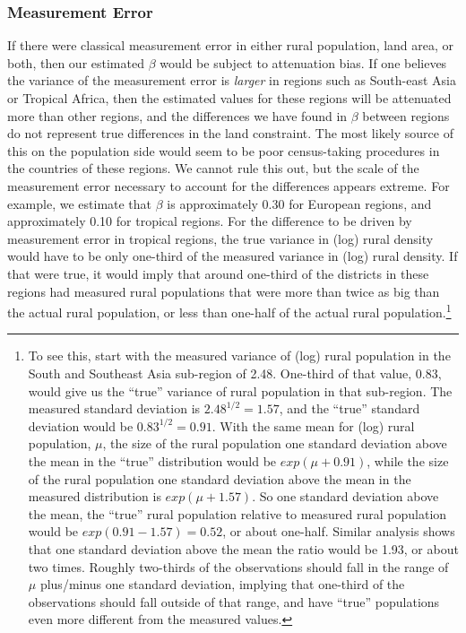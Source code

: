 \documentclass[11pt]{article}
\begin{document}
\subsubsection{Measurement Error} 
If there were classical measurement error in either rural population, land area, or both, then our estimated $\beta$ would be subject to attenuation bias. If one believes the variance of the measurement error is \textit{larger} in regions such as South-east Asia or Tropical Africa, then the estimated values for these regions will be attenuated more than other regions, and the differences we have found in $\beta$ between regions do not represent true differences in the land constraint. The most likely source of this on the population side would seem to be poor census-taking procedures in the countries of these regions. We cannot rule this out, but the scale of the measurement error necessary to account for the differences appears extreme. For example, we estimate that $\beta$ is approximately 0.30 for European regions, and approximately 0.10 for tropical regions. For the difference to be driven by measurement error in tropical regions, the true variance in (log) rural density would have to be only one-third of the measured variance in (log) rural density. If that were true, it would imply that around one-third of the districts in these regions had measured rural populations that were more than twice as big than the actual rural population, or less than one-half of the actual rural population.\footnote{To see this, start with the measured variance of (log) rural population in the South and Southeast Asia sub-region of 2.48. One-third of that value, 0.83, would give us the ``true'' variance of rural population in that sub-region. The measured standard deviation is $2.48^{1/2} = 1.57$, and the ``true'' standard deviation would be $0.83^{1/2}= 0.91$. With the same mean for (log) rural population, $\mu$, the size of the rural population one standard deviation above the mean in the ``true'' distribution would be $exp(\mu+0.91)$, while the size of the rural population one standard deviation above the mean in the measured distribution is $exp(\mu+1.57)$. So one standard deviation above the mean, the ``true'' rural population relative to measured rural population would be $exp(0.91 - 1.57) = 0.52$, or about one-half. Similar analysis shows that one standard deviation above the mean the ratio would be 1.93, or about two times. Roughly two-thirds of the observations should fall in the range of $\mu$ plus/minus one standard deviation, implying that one-third of the observations should fall outside of that range, and have ``true'' populations even more different from the measured values.}
\end{document}
